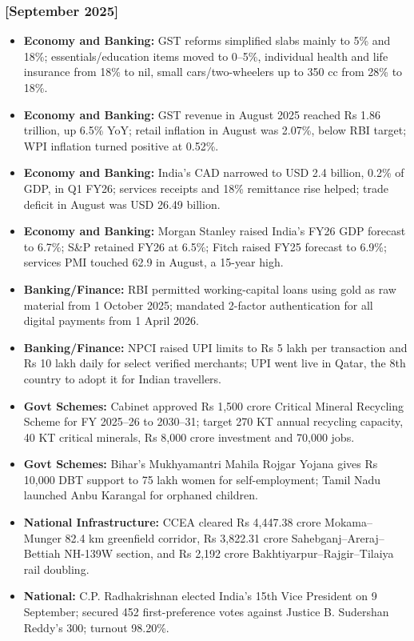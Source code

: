 \documentclass[10pt,a4paper]{article}
\newcommand{\monthtag}[1]{\textbf{[#1]}}
\begin{document}
\subsubsection{\monthtag{September 2025}}
\begin{itemize}
    \item \textbf{Economy and Banking:} GST reforms simplified slabs mainly to 5\% and 18\%; essentials/education items moved to 0--5\%, individual health and life insurance from 18\% to nil, small cars/two-wheelers up to 350 cc from 28\% to 18\%.
    \item \textbf{Economy and Banking:} GST revenue in August 2025 reached Rs 1.86 trillion, up 6.5\% YoY; retail inflation in August was 2.07\%, below RBI target; WPI inflation turned positive at 0.52\%.
    \item \textbf{Economy and Banking:} India's CAD narrowed to USD 2.4 billion, 0.2\% of GDP, in Q1 FY26; services receipts and 18\% remittance rise helped; trade deficit in August was USD 26.49 billion.
    \item \textbf{Economy and Banking:} Morgan Stanley raised India's FY26 GDP forecast to 6.7\%; S\&P retained FY26 at 6.5\%; Fitch raised FY25 forecast to 6.9\%; services PMI touched 62.9 in August, a 15-year high.
    \item \textbf{Banking/Finance:} RBI permitted working-capital loans using gold as raw material from 1 October 2025; mandated 2-factor authentication for all digital payments from 1 April 2026.
    \item \textbf{Banking/Finance:} NPCI raised UPI limits to Rs 5 lakh per transaction and Rs 10 lakh daily for select verified merchants; UPI went live in Qatar, the 8th country to adopt it for Indian travellers.
    \item \textbf{Govt Schemes:} Cabinet approved Rs 1,500 crore Critical Mineral Recycling Scheme for FY 2025--26 to 2030--31; target 270 KT annual recycling capacity, 40 KT critical minerals, Rs 8,000 crore investment and 70,000 jobs.
    \item \textbf{Govt Schemes:} Bihar's Mukhyamantri Mahila Rojgar Yojana gives Rs 10,000 DBT support to 75 lakh women for self-employment; Tamil Nadu launched Anbu Karangal for orphaned children.
    \item \textbf{National Infrastructure:} CCEA cleared Rs 4,447.38 crore Mokama--Munger 82.4 km greenfield corridor, Rs 3,822.31 crore Sahebganj--Areraj--Bettiah NH-139W section, and Rs 2,192 crore Bakhtiyarpur--Rajgir--Tilaiya rail doubling.
    \item \textbf{National:} C.P. Radhakrishnan elected India's 15th Vice President on 9 September; secured 452 first-preference votes against Justice B. Sudershan Reddy's 300; turnout 98.20\%.

\end{itemize}
\end{document}
